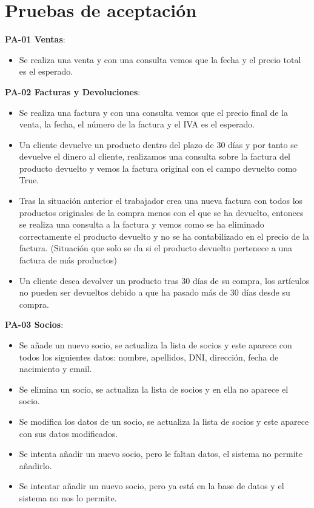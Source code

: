 \section{Pruebas de aceptación}

\textbf{PA-01 Ventas}:
\begin{itemize}
	\item Se realiza una venta y con una consulta vemos que la fecha y el precio total es el esperado.
\end{itemize}

\textbf{PA-02 Facturas y Devoluciones}:
\begin{itemize}
	\item Se realiza una factura y con una consulta vemos que el precio final de la venta, la fecha, el número de la factura y el IVA es el esperado.
	\item Un cliente devuelve un producto dentro del plazo de 30 días y por tanto se devuelve el dinero al cliente, realizamos una consulta sobre la factura del producto devuelto y vemos la factura original con el campo devuelto como True.
	\item Tras la situación anterior el trabajador crea una nueva factura con todos los productos originales de la compra menos con el que se ha devuelto, entonces se realiza una consulta a la factura y vemos como se ha eliminado correctamente el producto devuelto y no se ha contabilizado en el precio de la factura. (Situación que solo se da si el producto devuelto pertenece a una factura de más productos)
	\item Un cliente desea devolver un producto tras 30 días de su compra, los artículos no pueden ser devueltos debido a que ha pasado más de 30 días desde su compra.
\end{itemize}

\textbf{PA-03 Socios}:
\begin{itemize}
	\item Se añade un nuevo socio, se actualiza la lista de socios y este aparece con todos los siguientes datos: nombre, apellidos, DNI, dirección, fecha de nacimiento y email.
	\item Se elimina un socio, se actualiza la lista de socios y en ella no aparece el socio.
	\item Se modifica los datos de un socio, se actualiza la lista de socios y este aparece con sus datos modificados.
	\item Se intenta añadir un nuevo socio, pero le faltan datos, el sistema no permite añadirlo.
	\item Se intentar añadir un nuevo socio, pero ya está en la base de datos y el sistema no nos lo permite.
\end{itemize}

